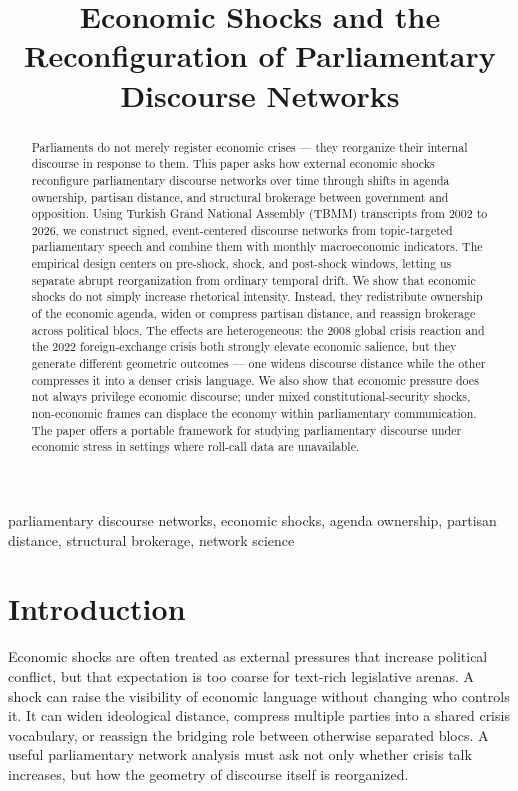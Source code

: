 \documentclass[conference]{IEEEtran}
\title{Economic Shocks and the Reconfiguration of Parliamentary Discourse Networks}
\author{
\IEEEauthorblockN{Mehmet Selman Yilmaz}
\IEEEauthorblockA{
CS 414/514 Network Science\\
Sabanci University\\
Istanbul, Turkey
}
}
\begin{document}
\maketitle

\begin{abstract}
Parliaments do not merely register economic crises — they reorganize their internal discourse in response to them. This paper asks how external economic shocks reconfigure parliamentary discourse networks over time through shifts in agenda ownership, partisan distance, and structural brokerage between government and opposition. Using Turkish Grand National Assembly (TBMM) transcripts from 2002 to 2026, we construct signed, event-centered discourse networks from topic-targeted parliamentary speech and combine them with monthly macroeconomic indicators. The empirical design centers on pre-shock, shock, and post-shock windows, letting us separate abrupt reorganization from ordinary temporal drift. We show that economic shocks do not simply increase rhetorical intensity. Instead, they redistribute ownership of the economic agenda, widen or compress partisan distance, and reassign brokerage across political blocs. The effects are heterogeneous: the 2008 global crisis reaction and the 2022 foreign-exchange crisis both strongly elevate economic salience, but they generate different geometric outcomes — one widens discourse distance while the other compresses it into a denser crisis language. We also show that economic pressure does not always privilege economic discourse; under mixed constitutional-security shocks, non-economic frames can displace the economy within parliamentary communication. The paper offers a portable framework for studying parliamentary discourse under economic stress in settings where roll-call data are unavailable.
\end{abstract}

\begin{IEEEkeywords}
parliamentary discourse networks, economic shocks, agenda ownership, partisan distance, structural brokerage, network science
\end{IEEEkeywords}

\smallskip
\section{Introduction}
Economic shocks are often treated as external pressures that increase political conflict, but that expectation is too coarse for text-rich legislative arenas. A shock can raise the visibility of economic language without changing who controls it. It can widen ideological distance, compress multiple parties into a shared crisis vocabulary, or reassign the bridging role between otherwise separated blocs. A useful parliamentary network analysis must ask not only whether crisis talk increases, but how the geometry of discourse itself is reorganized.
\end{document}
